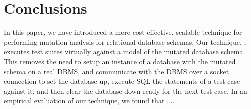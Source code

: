 
\section{Conclusions}
\label{sec:conclusions}
In this paper, we have introduced a more cost-effective, scalable technique for performing mutation analysis for relational database schemas. Our technique, \vma, executes test suites virtually against a model of the mutated database schema. This removes the need to setup an instance of a database with the mutated schema on a real DBMS, and communicate with the DBMS over a socket connection to set the database up, execute SQL the \INSERT statements of a test case against it, and then clear the database down ready for the next test case. In an empirical evaluation of our technique, we found that .... %
